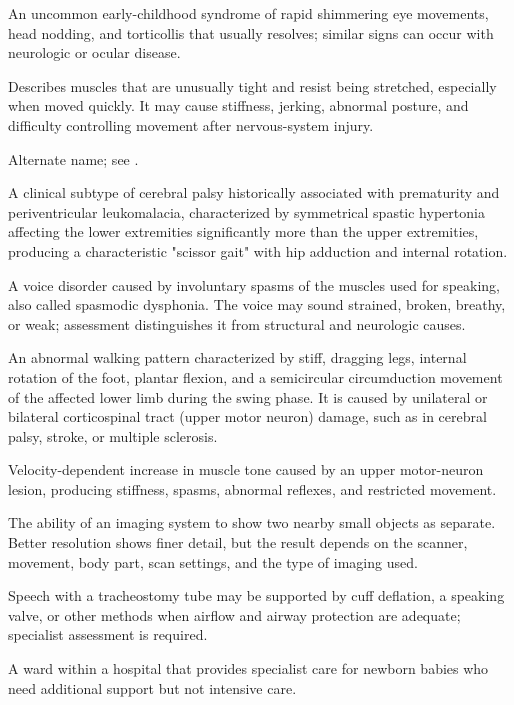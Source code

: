  An uncommon early-childhood syndrome of rapid shimmering eye movements, head nodding, and torticollis that usually resolves; similar signs can occur with neurologic or ocular disease.

 Describes muscles that are unusually tight and resist being stretched, especially when moved quickly. It may cause stiffness, jerking, abnormal posture, and difficulty controlling movement after nervous-system injury.

 Alternate name; see .

 A clinical subtype of cerebral palsy historically associated with prematurity and periventricular leukomalacia, characterized by symmetrical spastic hypertonia affecting the lower extremities significantly more than the upper extremities, producing a characteristic "scissor gait" with hip adduction and internal rotation.

 A voice disorder caused by involuntary spasms of the muscles used for speaking, also called spasmodic dysphonia. The voice may sound strained, broken, breathy, or weak; assessment distinguishes it from structural and neurologic causes.

 An abnormal walking pattern characterized by stiff, dragging legs, internal rotation of the foot, plantar flexion, and a semicircular circumduction movement of the affected lower limb during the swing phase. It is caused by unilateral or bilateral corticospinal tract (upper motor neuron) damage, such as in cerebral palsy, stroke, or multiple sclerosis.

 Velocity-dependent increase in muscle tone caused by an upper motor-neuron lesion, producing stiffness, spasms, abnormal reflexes, and restricted movement.

 The ability of an imaging system to show two nearby small objects as separate. Better resolution shows finer detail, but the result depends on the scanner, movement, body part, scan settings, and the type of imaging used.

 Speech with a tracheostomy tube may be supported by cuff deflation, a speaking valve, or other methods when airflow and airway protection are adequate; specialist assessment is required.

 A ward within a hospital that provides specialist care for newborn babies who need
additional support but not intensive care.

